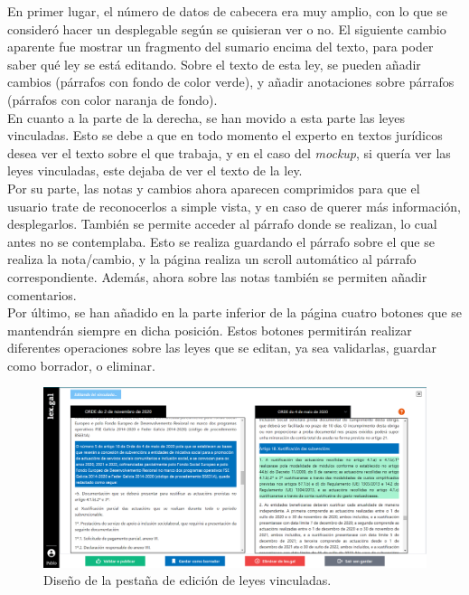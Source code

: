 En primer lugar, el número de datos de cabecera era muy amplio, con lo que se consideró hacer un desplegable según se quisieran ver o no. El siguiente cambio aparente fue mostrar un fragmento del sumario encima del texto, para poder saber qué ley se está editando. Sobre el texto de esta ley, se pueden añadir cambios (párrafos con fondo de color verde), y añadir anotaciones sobre párrafos (párrafos con color naranja de fondo).
\\

En cuanto a la parte de la derecha, se han movido a esta parte las leyes vinculadas. Esto se debe a que en todo momento el experto en textos jurídicos desea ver el texto sobre el que trabaja, y en el caso del {\it mockup}, si quería ver las leyes vinculadas, este dejaba de ver el texto de la ley. 
\\

Por su parte, las notas y cambios ahora aparecen comprimidos para que el usuario trate de reconocerlos a simple vista, y en caso de querer más información, desplegarlos. También se permite acceder al párrafo donde se realizan, lo cual antes no se contemplaba. Esto se realiza guardando el párrafo sobre el que se realiza la nota/cambio, y la página realiza un scroll automático al párrafo correspondiente. Además, ahora sobre las notas también se permiten añadir comentarios.
\\

Por último, se han añadido en la parte inferior de la página cuatro botones que se mantendrán siempre en dicha posición. Estos botones permitirán realizar diferentes operaciones sobre las leyes que se editan, ya sea validarlas, guardar como borrador, o eliminar.

\begin{figure}[H]
\centerline{\includegraphics[width=15cm]{figuras/manualUsuario/PestanaLeyVinculada.PNG}}
\caption{Diseño de la pestaña de edición de leyes vinculadas.}
\label{enlacePLeyVinculadaDiseno}
\end{figure}

